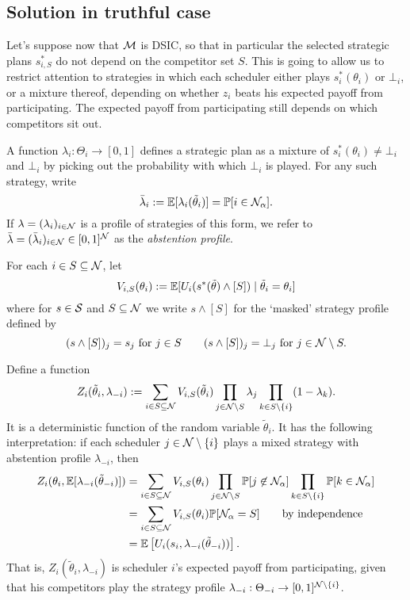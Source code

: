 \subsection{Solution in truthful case}
\label{section:dsic}

Let's suppose now that $\mathcal{M}$ is DSIC, so that in particular the selected strategic plans $s^*_{i,S}$ do not depend on the competitor set $S$.
%
This is going to allow us to restrict attention to strategies in which each scheduler either plays $s^*_i(\theta_i)$ or $\bot_i$, or a mixture thereof, depending on whether $z_i$ beats his expected payoff from participating.
%
The expected payoff from participating still depends on which competitors sit out.

A function $\lambda_i:\Theta_i\rightarrow[0,1]$ defines a strategic plan as a mixture of $s^*_i(\theta_i)\neq\bot_i$ and $\bot_i$ by picking out the probability with which $\bot_i$ is played.
%
For any such strategy, write
%
\[ 
  \bar\lambda_i := \mathbb{E}[\lambda_i(\tilde\theta_i)] = \mathbb{P}[i\in\mathcal{N}_\alpha].
\]
%
If $\lambda=(\lambda_i)_{i\in\mathcal{N}}$ is a profile of strategies of this form, we refer to $\bar\lambda = (\bar\lambda_i)_{i\in\mathcal{N}}\in [0,1]^{\mathcal{N}}$ as the \emph{abstention profile}.

For each $i\in S\subseteq\mathcal{N}$, let 
\[
  V_{i,S}(\theta_i) := \mathbb{E}[U_i(s^*(\tilde\theta) \wedge [S])\mid \tilde\theta_i=\theta_i]
\]
%
where for $s\in\mathcal{S}$ and $S\subseteq\mathcal{N}$ we write $s\wedge [S]$ for the `masked' strategy profile defined by 
%
\[
  (s\wedge[S])_j = s_j \text{ for } j\in S \qquad (s\wedge[S])_j = \bot_j \text{ for } j\in\mathcal{N}\setminus S.
\]

Define a function
%
\[
  Z_i(\tilde\theta_i,\lambda_{-i}) := \sum_{i\in S\subseteq \mathcal{N}} V_{i,S}(\tilde\theta_i)\prod_{j\in\mathcal{N}\setminus S}\lambda_j\prod_{k\in S\setminus\{i\}}(1-\lambda_k).
\]
%
It is a deterministic function of the random variable $\tilde\theta_i$.
%
It has the following interpretation: if each scheduler $j\in\mathcal{N}\setminus\{i\}$ plays a mixed strategy with abstention profile $\lambda_{-i}$, then
%
\begin{align*}
  Z_i(\theta_i,\mathbb{E}[\lambda_{-i}(\tilde\theta_{-i})]) &= \sum_{i\in S\subseteq \mathcal{N}} V_{i,S}(\theta_i)\prod_{j\in\mathcal{N}\setminus S}\mathbb{P}[j\not\in\mathcal{N}_\alpha]\prod_{k\in S\setminus\{i\}}\mathbb{P}[k\in\mathcal{N}_\alpha] \\
  &= \sum_{i\in S\subseteq\mathcal{N}}  V_{i,S}(\theta_i) \mathbb{P}[\mathcal{N}_\alpha = S] \qquad \text{by independence}\\
  &= \mathbb{E}\left[ U_i(s_i,\lambda_{-i}(\tilde\theta_{-i}))\right].
\end{align*}
%
That is, $Z_i(\tilde\theta_i,\lambda_{-i})$ is scheduler $i$'s expected payoff from participating, given that his competitors play the strategy profile $\lambda_{-i}:\Theta_{-i}\rightarrow [0,1]^{\mathcal{N}\setminus\{i\}}$.




